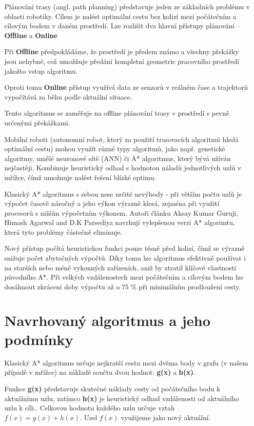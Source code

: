 \documentclass[10pt, a4paper]{article}
\begin{document}
Plánování trasy (angl. path planning) představuje jeden ze základních problému v oblasti robotiky. Cílem je nalést optimální cestu bez kolizí mezi počátečním a cílovým bodem v daném prostředí. Lze rozlišit dva hlavní přístupy plánování – \textbf{Offline} a \textbf{Online}

Při \textbf{Offline} předpokládáme, že prostředí je předem známo a všechny překážky jsou nehybné, což umožňuje předání kompletní geometrie pracovního prostředí jakožto vstup algoritmu.

Oproti tomu \textbf{Online} přístup využívá data ze senzorů v reálném čase a trajektorii vypočítává za běhu podle aktuální situace.

Tento algoritmus se zaměřuje na offline plánování trasy v prostředí s pevně určenými překážkami.

Mobilní roboti (autonomní robot, který za použití trasovacích algoritmů hledá optimální cestu) mohou využít různé typy algoritmů, jako např. genetické algoritmy, umělé neuronové sítě (ANN) či A* algoritmus, který bývá užíván nejčastěji. Kombinuje heuristický odhad s hodnotou náladů jednotlivých uzlů v mřížce, čímž umožnuje nalést řešení blízké optimu.

Klasický A* algoritmus s sebou nese určité nevýhody - při větším počtu uzlů je výpočet časově náročný a jeho výkon výrazně klesá, zejména při využití procesorů s nižším výpočetním výkonem. Autoři článku Aksay Kumar Guruji, Himash Agarwal and D.K Parsediya navrhují vylepšenou verzi A* algorimtu, která tyto problémy částečně eliminuje.

Nový přístup počítá heuristickou funkci pouze těsně před kolizí, čímž se výrazně snižuje počet zbytečných výpočtů. Díky tomu lze algoritmus efektivně používat i na starších nebo méně vykonných zařízeních, aniž by ztratil klíčové vlastnosti původního A*.
Při velkých vzdálenostech mezi počátečním a cílovým bodem lze dosáhnout zkrácení doby výpočtu až o 75 \% při minimálním prodloužení cesty.

\newpage
\section{Navrhovaný algoritmus a jeho podmínky}
Klasický A* algoritmus určuje nejkratší cestu mezi dvěma body v grafu (v našem případě v mřížce) na základě součtu dvou hodnot: \textbf{g(x)} a \textbf{h(x)}.

Funkce \textbf{g(x)} představuje skutečné náklady cesty od počátečního bodu k aktuálnímu uzlu, zatímco \textbf{h(x)} je heuristický odhad vzdálenosti od aktuálního uzlu k cíli.\cite{WikiAStar}.
Celkovou hodnotu každého uzlu určuje vztah $f(x) = g(x) + h(x)$.
Uzel $f(x)$ využijeme jako nový aktuální.
\end{document}
